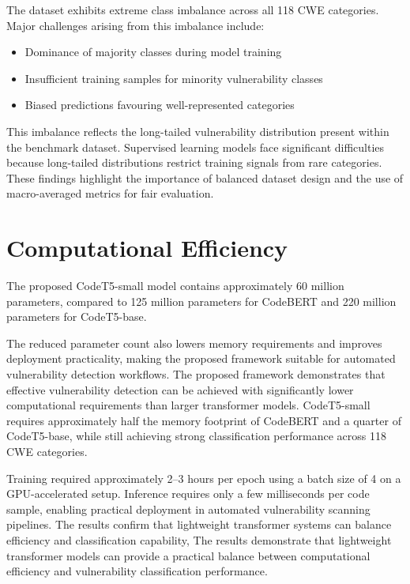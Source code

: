 \documentclass[conference]{IEEEtran}
\begin{document}
The dataset exhibits extreme class imbalance across all 118 CWE categories. Major challenges arising from this imbalance include:
\begin{itemize}
    \item Dominance of majority classes during model training
    \item Insufficient training samples for minority vulnerability classes
    \item Biased predictions favouring well-represented categories
\end{itemize}

This imbalance reflects the long-tailed vulnerability distribution present within the benchmark dataset. Supervised learning models face significant difficulties because long-tailed distributions restrict training signals from rare categories. These findings highlight the importance of balanced dataset design and the use of macro-averaged metrics for fair evaluation.

\section{Computational Efficiency}

The proposed CodeT5-small model contains approximately 60 million parameters, compared to 125 million parameters for CodeBERT and 220 million parameters for CodeT5-base.

The reduced parameter count also lowers memory requirements and improves deployment practicality, making the proposed framework suitable for automated vulnerability detection workflows.
The proposed framework demonstrates that effective vulnerability detection can be achieved with significantly lower computational requirements than larger transformer models. CodeT5-small requires approximately half the memory footprint of CodeBERT and a quarter of CodeT5-base, while still achieving strong classification performance across 118 CWE categories.

Training required approximately 2–3 hours per epoch using a batch size of 4 on a GPU-accelerated setup. Inference requires only a few milliseconds per code sample, enabling practical deployment in automated vulnerability scanning pipelines. The results confirm that lightweight transformer systems can balance efficiency and classification capability, The results demonstrate that lightweight transformer models can provide a practical balance between computational efficiency and vulnerability classification performance.
\end{document}
